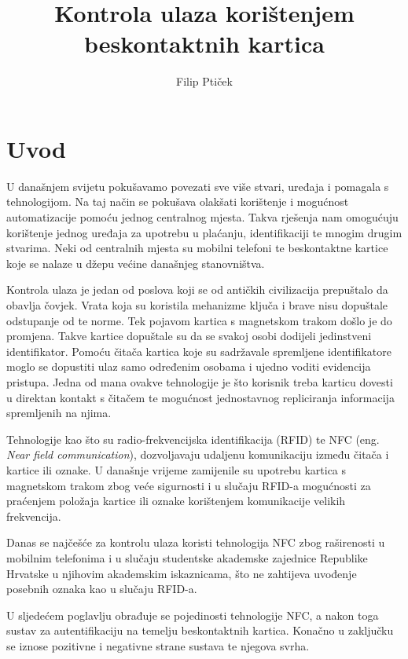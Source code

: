 \documentclass[times, utf8, zavrsni]{fer}
\begin{document}

\title{Kontrola ulaza korištenjem beskontaktnih kartica}

\author{Filip Ptiček}

\maketitle




\zahvala{}

\tableofcontents			

\chapter{Uvod}
U današnjem svijetu pokušavamo povezati sve više stvari, uređaja i pomagala s tehnologijom. Na taj način se pokušava olakšati korištenje i mogućnost automatizacije pomoću jednog centralnog mjesta. Takva rješenja nam omogućuju korištenje jednog uređaja za upotrebu u plaćanju, identifikaciji te mnogim drugim stvarima. Neki od centralnih mjesta su mobilni telefoni te beskontaktne kartice koje se nalaze u džepu većine današnjeg stanovništva.\par
Kontrola ulaza je jedan od poslova koji se od antičkih civilizacija prepuštalo da obavlja čovjek. Vrata koja su koristila mehanizme ključa i brave nisu dopuštale odstupanje od te norme. Tek pojavom kartica s magnetskom trakom došlo je do promjena. Takve kartice dopuštale su da se svakoj osobi dodijeli jedinstveni identifikator. Pomoću čitača kartica koje su sadržavale spremljene identifikatore moglo se dopustiti ulaz samo određenim osobama i ujedno voditi evidencija pristupa. Jedna od mana ovakve tehnologije je što korisnik treba karticu dovesti u direktan kontakt s čitačem te mogućnost jednostavnog repliciranja informacija spremljenih na njima.\par
Tehnologije kao što su radio-frekvencijska identifikacija (RFID) te NFC (eng. \textit{Near field communication}), dozvoljavaju udaljenu komunikaciju između čitača i kartice ili oznake. U današnje vrijeme zamijenile su upotrebu kartica s magnetskom trakom zbog veće sigurnosti i u slučaju RFID-a mogućnosti za praćenjem položaja kartice ili oznake korištenjem komunikacije velikih frekvencija.\par
Danas se najčešće za kontrolu ulaza koristi tehnologija NFC zbog raširenosti u mobilnim telefonima i u slučaju studentske akademske zajednice Republike Hrvatske u njihovim akademskim iskaznicama, što ne zahtijeva uvođenje posebnih oznaka kao u slučaju RFID-a. \par 
U sljedećem poglavlju obrađuje se pojedinosti tehnologije NFC, a nakon toga sustav za autentifikaciju na temelju beskontaktnih kartica. Konačno u zaključku se iznose pozitivne i negativne strane sustava te njegova svrha.
\end{document}
